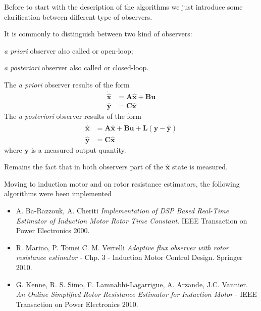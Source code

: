 \documentclass[12pt,a4paper]{scrartcl}
\newenvironment{myitemize_3}
{ \begin{itemize}[topsep=4pt]
		\setlength{\topsep}{4pt}
		\setlength{\itemsep}{4pt}
		\setlength{\parskip}{4pt}
		\setlength{\parsep}{6pt}     }
	{ \end{itemize}                  }
\begin{document}
\begin{onehalfspace}
Before to start with the description of the algorithms we just introduce some clarification between different type of observers. 

It is commonly to distinguish between two kind of observers:
\begin{myitemize_3}
	\item[--] \textit{a priori} observer also called  or open-loop;
	\item[--] \textit{a posteriori} observer also called  or closed-loop.
\end{myitemize_3}

The \textit{a priori} observer results of the form
\begin{equation}
	\begin{split}
		\dot{\hat{\boldsymbol{x}}} & = \boldsymbol{A} \hat{\boldsymbol{x}} + \boldsymbol{B}\boldsymbol{u} \\[6pt]
		\hat{\boldsymbol{y}} & = \boldsymbol{C}\hat{\boldsymbol{x}}
	\end{split}
\end{equation}
The \textit{a posteriori} observer results of the form
\begin{equation}
	\begin{split}
		\dot{\hat{\boldsymbol{x}}} & = \boldsymbol{A} \hat{\boldsymbol{x}} + \boldsymbol{B}\boldsymbol{u}
		 + \boldsymbol{L}\left(\boldsymbol{y}-\hat{\boldsymbol{y}}\right)\\[6pt]
		\hat{\boldsymbol{y}} & = \boldsymbol{C}\hat{\boldsymbol{x}}
	\end{split}
\end{equation}
where $\boldsymbol{y}$ is a measured output quantity.

Remains the fact that in both observers part of the $\hat{\boldsymbol{x}}$ state is measured.

Moving to induction motor and on rotor resistance estimators, the following algorithms were been implemented
\begin{itemize}
	\item A. Ba-Razzouk, A. Cheriti \textit{Implementation of DSP Based Real-Time Estimator of Induction Motor Rotor Time Constant}. IEEE Transaction on Power Electronics 2000.
	\item R. Marino, P. Tomei C. M. Verrelli \textit{Adaptive flux observer with rotor resistance estimator} - Chp. 3 - Induction Motor Control Design. Springer 2010.
	\item G. Kenne, R. S. Simo, F. Lamnabhi-Lagarrigue, A. Arzande, J.C. Vannier. \textit{An Online Simplified Rotor Resistance Estimator for Induction Motor} - IEEE Transaction on Power Electronics 2010.
\end{itemize}


\end{onehalfspace}
\end{document}
